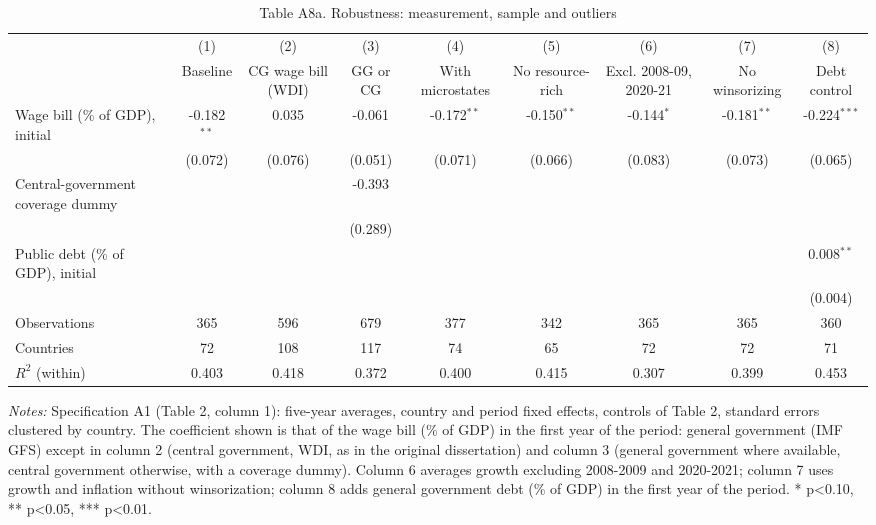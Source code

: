 \begin{table}[htbp]\centering\footnotesize
\providecommand{\sym}[1]{\ensuremath{^{#1}}}
\caption{Table A8a. Robustness: measurement, sample and outliers}\label{tab:TableA8a_robustness_definitions}
\begin{tabular}{l*{8}{c}}
\toprule
 & (1) & (2) & (3) & (4) & (5) & (6) & (7) & (8) \\
 & Baseline & CG wage bill (WDI) & GG or CG & With microstates & No resource-rich & Excl. 2008-09, 2020-21 & No winsorizing & Debt control \\
\midrule
Wage bill (\% of GDP), initial & -0.182\sym{**} & 0.035 & -0.061 & -0.172\sym{**} & -0.150\sym{**} & -0.144\sym{*} & -0.181\sym{**} & -0.224\sym{***} \\
 & (0.072) & (0.076) & (0.051) & (0.071) & (0.066) & (0.083) & (0.073) & (0.065) \\
Central-government coverage dummy &  &  & -0.393 &  &  &  &  &  \\
 &  &  & (0.289) &  &  &  &  &  \\
Public debt (\% of GDP), initial &  &  &  &  &  &  &  & 0.008\sym{**} \\
 &  &  &  &  &  &  &  & (0.004) \\
\midrule
Observations & 365 & 596 & 679 & 377 & 342 & 365 & 365 & 360 \\
Countries & 72 & 108 & 117 & 74 & 65 & 72 & 72 & 71 \\
$R^2$ (within) & 0.403 & 0.418 & 0.372 & 0.400 & 0.415 & 0.307 & 0.399 & 0.453 \\
\bottomrule
\end{tabular}
\begin{minipage}{0.95\linewidth}\vspace{4pt}\scriptsize \textit{Notes:} Specification A1 (Table 2, column 1): five-year averages, country and period fixed effects, controls of Table 2, standard errors clustered by country. The coefficient shown is that of the wage bill (\% of GDP) in the first year of the period: general government (IMF GFS) except in column 2 (central government, WDI, as in the original dissertation) and column 3 (general government where available, central government otherwise, with a coverage dummy). Column 6 averages growth excluding 2008-2009 and 2020-2021; column 7 uses growth and inflation without winsorization; column 8 adds general government debt (\% of GDP) in the first year of the period. * p<0.10, ** p<0.05, *** p<0.01.\end{minipage}
\end{table}
